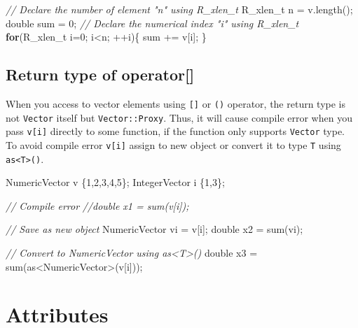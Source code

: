 \documentclass[]{book}
\newenvironment{Shaded}{\begin{snugshade}}{\end{snugshade}}
\newcommand{\CommentTok}[1]{\textcolor[rgb]{0.56,0.35,0.01}{\textit{#1}}}
\newcommand{\ControlFlowTok}[1]{\textcolor[rgb]{0.13,0.29,0.53}{\textbf{#1}}}
\newcommand{\DataTypeTok}[1]{\textcolor[rgb]{0.13,0.29,0.53}{#1}}
\newcommand{\DecValTok}[1]{\textcolor[rgb]{0.00,0.00,0.81}{#1}}
\newcommand{\NormalTok}[1]{#1}
\begin{document}
\begin{Shaded}
\begin{Highlighting}[]
\CommentTok{// Declare the number of element "n" using R_xlen_t}
\DataTypeTok{R_xlen_t}\NormalTok{ n = v.length();}
\DataTypeTok{double}\NormalTok{ sum = }\DecValTok{0}\NormalTok{;}
\CommentTok{// Declare the numerical index "i" using R_xlen_t}
\ControlFlowTok{for}\NormalTok{(}\DataTypeTok{R_xlen_t}\NormalTok{ i=}\DecValTok{0}\NormalTok{; i<n; ++i)\{}
\NormalTok{  sum += v[i];}
\NormalTok{\}}
\end{Highlighting}
\end{Shaded}

\hypertarget{return-type-of-operator}{%
\section{Return type of operator{[}{]}}\label{return-type-of-operator}}

When you access to vector elements using \texttt{{[}{]}} or \texttt{()} operator, the return type is not \texttt{Vector} itself but \texttt{Vector::Proxy}. Thus, it will cause compile error when you pass \texttt{v{[}i{]}} directly to some function, if the function only supports \texttt{Vector} type. To avoid compile error \texttt{v{[}i{]}} assign to new object or convert it to type \texttt{T} using \texttt{as\textless{}T\textgreater{}()}.

\begin{Shaded}
\begin{Highlighting}[]
\NormalTok{NumericVector v \{}\DecValTok{1}\NormalTok{,}\DecValTok{2}\NormalTok{,}\DecValTok{3}\NormalTok{,}\DecValTok{4}\NormalTok{,}\DecValTok{5}\NormalTok{\};}
\NormalTok{IntegerVector i \{}\DecValTok{1}\NormalTok{,}\DecValTok{3}\NormalTok{\};}

\CommentTok{// Compile error}
\CommentTok{//double x1 = sum(v[i]);}

\CommentTok{// Save as new object}
\NormalTok{NumericVector vi = v[i];}
\DataTypeTok{double}\NormalTok{   x2 = sum(vi);}

\CommentTok{// Convert to NumericVector using as<T>()}
\DataTypeTok{double}\NormalTok{   x3 = sum(as<NumericVector>(v[i]));}
\end{Highlighting}
\end{Shaded}

\hypertarget{attributes}{%
\chapter{Attributes}\label{attributes}}
\end{document}
